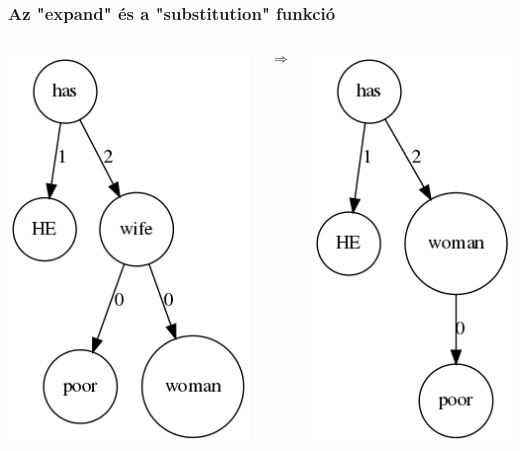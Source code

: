 \documentclass[bigger]{beamer}
\begin{document}
\begin{frame}
\frametitle{Az "expand" és a "substitution" funkció}
\begin{columns}
\begin{column}{0.3\textwidth}
\pause \includegraphics[scale=0.4]{pics/wifeexp.png}
\end{column}
\begin{column}{0.1\textwidth}
	\pause \[\Rightarrow\]
\end{column}
\begin{column}{0.3\textwidth}
	\pause \includegraphics[scale=0.4]{pics/abs.png}
\end{column}
\end{columns}
\end{frame}
\end{document}
